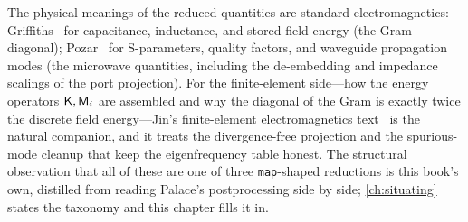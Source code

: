 \furtherreading
The physical meanings of the reduced quantities are standard electromagnetics:
Griffiths~\citep{griffiths2017} for capacitance, inductance, and stored field
energy (the Gram diagonal); Pozar~\citep{pozar2011} for S-parameters, quality
factors, and waveguide propagation modes (the microwave quantities, including the
de-embedding and impedance scalings of the port projection). For the
finite-element side---how the energy operators $\mathsf{K},\mathsf{M}_i$ are assembled and
why the diagonal of the Gram is exactly twice the discrete field energy---Jin's
finite-element electromagnetics text~\citep{jin2014} is the natural companion,
and it treats the divergence-free projection and the spurious-mode cleanup that
keep the eigenfrequency table honest. The structural observation that all of
these are one of three \texttt{map}-shaped reductions is this book's own, distilled
from reading Palace's postprocessing side by side; \cref{ch:situating} states the
taxonomy and this chapter fills it in.

